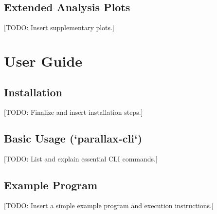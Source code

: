 \subsection{Extended Analysis Plots} %
[TODO: Insert supplementary plots.]

\section{User Guide} %

\subsection{Installation} %
[TODO: Finalize and insert installation steps.]

\subsection{Basic Usage (`parallax-cli`)} %
[TODO: List and explain essential CLI commands.]

\subsection{Example Program} %
[TODO: Insert a simple example program and execution instructions.]